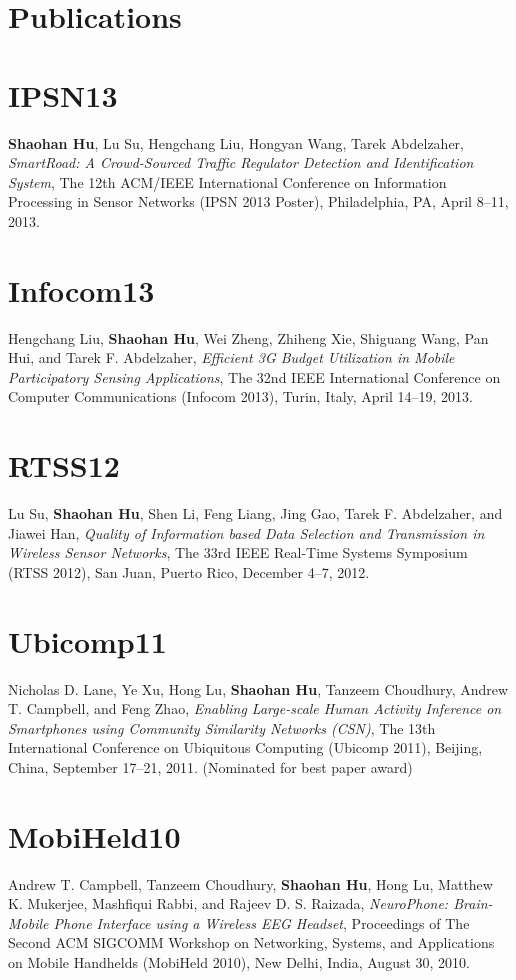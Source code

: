 
\section{\sc Publications}


\section{\sc IPSN13}
\textbf{Shaohan Hu}, Lu Su, Hengchang Liu, Hongyan Wang, Tarek
Abdelzaher, \emph{SmartRoad: A Crowd-Sourced Traffic Regulator
  Detection and Identification System}, \textsf{The 12th ACM/IEEE
  International Conference on Information Processing in Sensor
  Networks (IPSN 2013 Poster)}, Philadelphia, PA, April 8--11, 2013.

\section{\sc Infocom13}
Hengchang Liu, \textbf{Shaohan Hu}, Wei Zheng, Zhiheng Xie, Shiguang
Wang, Pan Hui, and Tarek F. Abdelzaher, \emph{Efficient 3G Budget
  Utilization in Mobile Participatory Sensing Applications},
\textsf{The 32nd IEEE International Conference on Computer
  Communications (Infocom 2013)}, Turin, Italy, April 14--19, 2013.

\section{\sc RTSS12}
Lu Su, \textbf{Shaohan Hu}, Shen Li, Feng Liang, Jing Gao, Tarek
F. Abdelzaher, and Jiawei Han, \emph{Quality of Information based Data
  Selection and Transmission in Wireless Sensor Networks}, \textsf{The
  33rd IEEE Real-Time Systems Symposium (RTSS 2012)}, San Juan,
Puerto Rico, December 4--7, 2012.

\section{\sc Ubicomp11}
Nicholas D. Lane, Ye Xu, Hong Lu, \textbf{Shaohan Hu}, Tanzeem
Choudhury, Andrew T. Campbell, and Feng Zhao, \emph{Enabling
  Large-scale Human Activity Inference on Smartphones using Community
  Similarity Networks (CSN)}, \textsf{The 13th International
  Conference on Ubiquitous Computing (Ubicomp 2011)}, Beijing, China,
September 17--21, 2011. (Nominated for best paper award)

\section{\sc MobiHeld10}
Andrew T. Campbell, Tanzeem Choudhury, \textbf{Shaohan Hu}, Hong Lu,
Matthew K. Mukerjee, Mashfiqui Rabbi, and Rajeev D. S. Raizada,
\emph{NeuroPhone: Brain-Mobile Phone Interface using a Wireless EEG
  Headset}, \textsf{Proceedings of The Second ACM SIGCOMM Workshop on Networking,
Systems, and Applications on Mobile Handhelds (MobiHeld 2010)}, New
Delhi, India, August 30, 2010.

